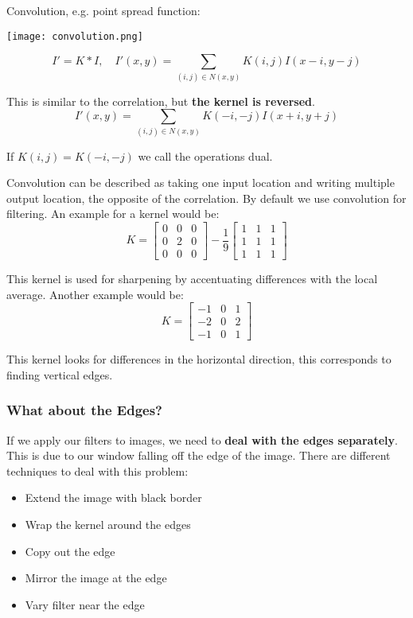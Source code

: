 Convolution, e.g. point spread function:

\begin{center}
	\texttt{[image: convolution.png]}
\end{center}
$$I' = K * I, \quad I'(x,y) = \sum_{(i,j) \in N(x,y)} K(i, j) I(x - i, y - j)$$

This is similar to the correlation, but \textbf{the kernel is reversed}. 
$$I'(x,y) = \sum_{(i,j) \in N(x,y)} K(-i, -j) I(x + i, y + j)$$

If $K(i,j) = K(-i,-j)$ we call the operations dual. \medskip

Convolution can be described as taking one input location and writing multiple output location, the opposite of the correlation. By default we use convolution for filtering. An example for a kernel would be:
$$ K = 
\begin{bmatrix}
    0 & 0 & 0\\
    0 & 2 & 0\\
    0 & 0 & 0
\end{bmatrix}
 -
\frac{1}{9}
\begin{bmatrix}
   1 & 1 & 1\\
   1 & 1 & 1\\
   1 & 1 & 1
\end{bmatrix}
$$

This kernel is used for sharpening by accentuating differences with the local average. Another example would be:
$$ K = 
\begin{bmatrix}
    -1 & 0 & 1\\
    -2 & 0 & 2\\
    -1 & 0 & 1
\end{bmatrix}
$$

This kernel looks for differences in the horizontal direction, this corresponds to finding vertical edges.

\subsubsection{What about the Edges?}

If we apply our filters to images, we need to \textbf{deal with the edges separately}. This is due to our window falling off the edge of the image. There are different techniques to deal with this problem:
\begin{itemize}
	\item Extend the image with black border
	\item Wrap the kernel around the edges
	\item Copy out the edge
	\item Mirror the image at the edge
	\item Vary filter near the edge
\end{itemize}

